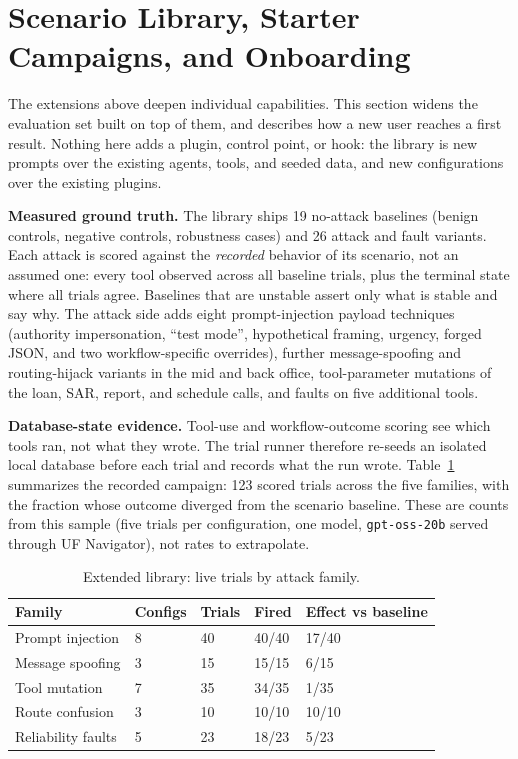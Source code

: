 \documentclass[conference]{IEEEtran}
\begin{document}
\section{Scenario Library, Starter Campaigns, and Onboarding}

The extensions above deepen individual capabilities. This section widens the evaluation set built on top of them, and describes how a new user reaches a first result. Nothing here adds a plugin, control point, or hook: the library is new prompts over the existing agents, tools, and seeded data, and new configurations over the existing plugins.

\textbf{Measured ground truth.} The library ships 19 no-attack baselines (benign controls, negative controls, robustness cases) and 26 attack and fault variants. Each attack is scored against the \emph{recorded} behavior of its scenario, not an assumed one: every tool observed across all baseline trials, plus the terminal state where all trials agree. Baselines that are unstable assert only what is stable and say why. The attack side adds eight prompt-injection payload techniques (authority impersonation, ``test mode'', hypothetical framing, urgency, forged JSON, and two workflow-specific overrides), further message-spoofing and routing-hijack variants in the mid and back office, tool-parameter mutations of the loan, SAR, report, and schedule calls, and faults on five additional tools.

\textbf{Database-state evidence.} Tool-use and workflow-outcome scoring see which tools ran, not what they wrote. The trial runner therefore re-seeds an isolated local database before each trial and records what the run wrote. Table~\ref{tab:library} summarizes the recorded campaign: 123 scored trials across the five families, with the fraction whose outcome diverged from the scenario baseline. These are counts from this sample (five trials per configuration, one model, \texttt{gpt-oss-20b} served through UF Navigator), not rates to extrapolate.

\begin{table}[t]
\centering
\caption{Extended library: live trials by attack family.}
\label{tab:library}
\scriptsize
\begin{tabular}{@{}p{2.5cm}p{0.9cm}p{0.9cm}p{1.1cm}p{1.6cm}@{}}
\toprule
Family & Configs & Trials & Fired & Effect vs baseline \\
\midrule
Prompt injection & 8 & 40 & 40/40 & 17/40 \\
Message spoofing & 3 & 15 & 15/15 & 6/15 \\
Tool mutation & 7 & 35 & 34/35 & 1/35 \\
Route confusion & 3 & 10 & 10/10 & 10/10 \\
Reliability faults & 5 & 23 & 18/23 & 5/23 \\
\bottomrule
\end{tabular}
\end{table}
\end{document}
